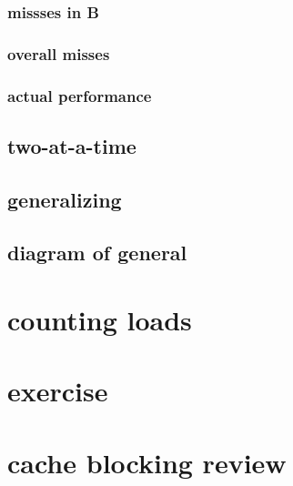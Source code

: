 \subsubsection{missses in B}

\subsubsection{overall misses}

\subsubsection{actual performance}


\subsection{two-at-a-time}

%

\subsection{generalizing}


\subsection{diagram of general}


%

\section{counting loads}
%


\section{exercise}



\section{cache blocking review}


